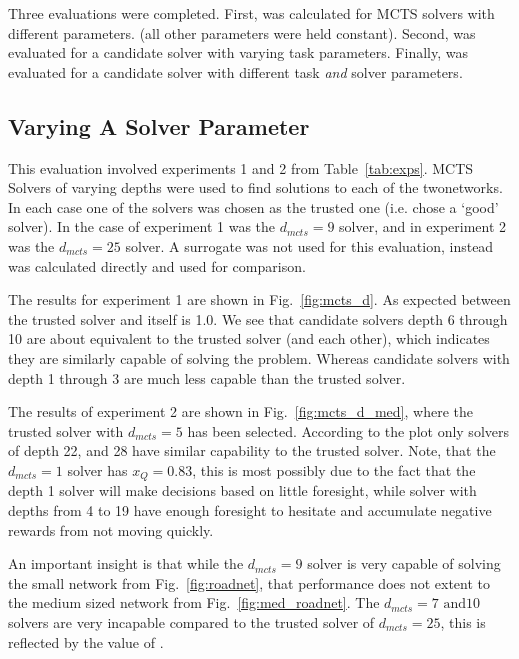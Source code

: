 Three evaluations were completed. First, \xQ{} was calculated for MCTS solvers with different parameters. (all other parameters were held constant). Second, \xQ{} was evaluated for a candidate solver with varying task parameters. Finally, \xQ{} was evaluated for a candidate solver with different task \emph{and} solver parameters.

\subsection{Varying A Solver Parameter}
This evaluation involved experiments 1 and 2 from Table~\ref{tab:exps}. MCTS Solvers of varying depths were used to find solutions to each of the twonetworks. In each case one of the solvers was chosen as the trusted one (i.e. chose a `good' solver). In the case of experiment 1 \solvestar{} was the $d_{mcts}=9$ solver, and in experiment 2 \solvestar{} was the $d_{mcts}=25$ solver. A surrogate \surrogate{} was not used for this evaluation, instead \rwdstar{} was calculated directly and used for comparison.

The results for experiment 1 are shown in Fig.~\ref{fig:mcts_d}. As expected \xQ{} between the trusted solver and itself is 1.0. We see that candidate solvers depth 6 through 10 are about equivalent to the trusted solver (and each other), which indicates they are similarly capable of solving the problem. Whereas candidate solvers with depth 1 through 3 are much less capable than the trusted solver.

The results of experiment 2 are shown in Fig.~\ref{fig:mcts_d_med}, where the trusted solver with $d_{mcts}=5$ has been selected. According to the plot only solvers of depth 22, and 28 have similar capability to the trusted solver. Note, that the $d_{mcts}=1$ solver has $x_Q=0.83$, this is most possibly due to the fact that the depth 1 solver will make decisions based on little foresight, while solver with depths from 4 to 19 have enough foresight to hesitate and accumulate negative rewards from not moving quickly.

An important insight is that while the $d_{mcts}=9$ solver is very capable of solving the small network from Fig.~\ref{fig:roadnet}, that performance does not extent to the medium sized network from Fig.~\ref{fig:med_roadnet}. The $d_{mcts}=7 \text{ and} 10$ solvers are very incapable compared to the trusted solver of $d_{mcts}=25$, this is reflected by the value of \xQ.

